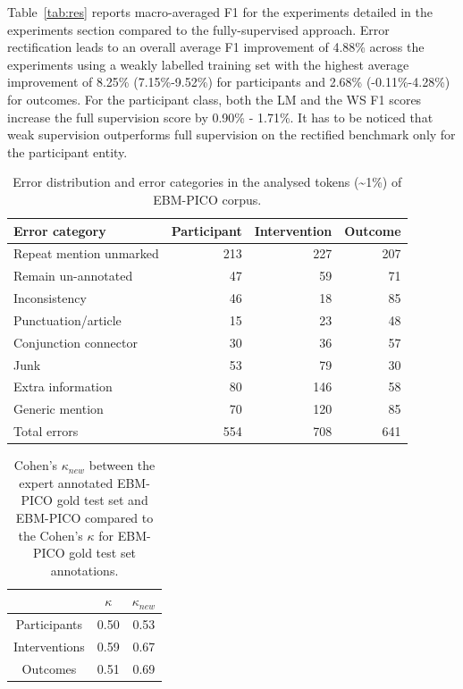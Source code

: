 \documentclass[10.7pt,]{article}
\let\oldparagraph\paragraph
\renewcommand{\paragraph}[1]{\oldparagraph{#1}\mbox{}}
\begin{document}
Table~\ref{tab:res} reports macro-averaged F1 for the experiments detailed in the experiments section compared to the fully-supervised approach.
Error rectification leads to an overall average F1 improvement of 4.88\% across the experiments using a weakly labelled training set with the highest average improvement of 8.25\% (7.15\%-9.52\%) for participants and 2.68\% (-0.11\%-4.28\%) for outcomes. 
For the participant class, both the LM and the WS F1 scores increase the full supervision score by 0.90\% - 1.71\%.
It has to be noticed that weak supervision outperforms full supervision on the rectified benchmark only for the participant entity.
%
\begin{table}[!ht]
    \centering
    \begin{tabular}{|l|r|r|r|}
    \hline
        Error category & Participant & Intervention & Outcome \\ \hline
        Repeat mention unmarked & 213 & 227 & 207 \\ 
        Remain un-annotated & 47 & 59 & 71 \\ 
        Inconsistency & 46 & 18 & 85 \\ 
        Punctuation/article & 15 & 23 & 48 \\ 
        Conjunction connector & 30 & 36 & 57 \\ 
        Junk & 53 & 79 & 30 \\ 
        Extra information & 80 & 146 & 58 \\ 
        Generic mention & 70 & 120 & 85 \\ \hline
        Total errors & 554 & 708 & 641 \\ \hline
    \end{tabular}
    \caption{\label{tab:errordist} Error distribution and error categories in the analysed tokens (\textasciitilde1\%) of EBM-PICO corpus.}
\end{table}
%
%
\begin{table}[h!]
\begin{center}
\begin{tabular}{| c | c | c |} 
\hline
 & $\kappa$ & $\kappa_{new}$ \\ 
\hline
Participants & 0.50 & 0.53  \\ 
Interventions & 0.59 & 0.67 \\ 
Outcomes & 0.51 & 0.69  \\
\hline
\end{tabular}
\caption{\label{tab:agreement} Cohen's $\kappa_{new}$ between the expert annotated EBM-PICO gold test set and EBM-PICO compared to the Cohen's $\kappa$ for EBM-PICO gold test set annotations.}
\end{center}
\end{table}
\end{document}
